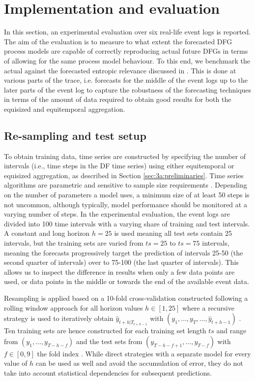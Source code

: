 \section{Implementation and evaluation}\label{sec:experiment}
In this section, an experimental evaluation over six real-life event logs is reported.
The aim of the evaluation is to measure to what extent the forecasted DFG process models are capable of correctly reproducing actual future DFGs in terms of allowing for the same process model behaviour.
To this end, we benchmark the actual against the forecasted entropic relevance discussed in .
This is done at various parts of the trace, i.e. forecasts for the middle of the event logs up to the later parts of the event log to capture the robustness of the forecasting techniques in terms of the amount of data required to obtain good results for both the equisized and equitemporal aggregation.

\subsection{Re-sampling and test setup}
To obtain training data, time series are constructed by specifying the number of intervals (i.e., time steps in the DF time series) using either equitemporal or equisized aggregation, as described in Section \ref{sec:3a:preliminaries}.
Time series algorithms are parametric and sensitive to sample size requirements \cite{hanke2001business}.
Depending on the number of parameters a model uses, a minimum size of at least 50 steps is not uncommon, although typically, model performance should be monitored at a varying number of steps.
In the experimental evaluation, the event logs are divided into 100 time intervals with a varying share of training and test intervals. A constant and long horizon $h=25$ is used meaning all test sets contain 25 intervals, but the training sets are varied from $ts=25$ to $ts=75$ intervals, meaning the forecasts progressively target the prediction of intervals 25-50 (the second quarter of intervals) over to 75-100 (the last quarter of intervals).
This allows us to inspect the difference in results when only a few data points are used, or data points in the middle or towards the end of the available event data.

Resampling is applied based on a 10-fold cross-validation constructed following a rolling window approach for all horizon values $h\in[1,25]$ where a recursive strategy is used to iteratively obtain $\hat{y}_{t+h|T_{t+h-1}}$ with $(y_1,\dots,y_{T},\dots,\hat{y}_{t+h-1})$ \cite{weigend2018time}.
Ten training sets are hence constructed for each training set length $ts$ and range from $(y_1,\dots,y_{T-h-f})$ and the test sets from $(y_{T-h-f+1},\dots,y_{T-f})$ with $f\in[0,9]$ the fold index \cite{bergmeir2012use}.
While direct strategies with a separate model for every value of $h$ can be used as well and avoid the accumulation of error, they do not take into account statistical dependencies for subsequent predictions.

